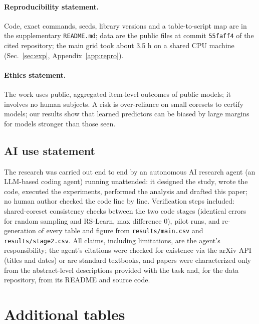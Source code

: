 \documentclass{article}
\begin{document}
\paragraph{Reproducibility statement.}
Code, exact commands, seeds, library versions and a table-to-script map are in the supplementary \texttt{README.md}; data are the public files at commit \texttt{55faff4} of the cited repository; the main grid took about 3.5 h on a shared CPU machine (Sec.~\ref{sec:exp}, Appendix~\ref{app:repro}).

\paragraph{Ethics statement.}
The work uses public, aggregated item-level outcomes of public models; it involves no human subjects. A risk is over-reliance on small coresets to certify models; our results show that learned predictors can be biased by large margins for models stronger than those seen.

\subsection*{AI use statement}
The research was carried out end to end by an autonomous AI research agent (an LLM-based coding agent) running unattended: it designed the study, wrote the code, executed the experiments, performed the analysis and drafted this paper; no human author checked the code line by line. Verification steps included: shared-coreset consistency checks between the two code stages (identical errors for random sampling and RS-Learn, max difference $0$), pilot runs, and re-generation of every table and figure from \texttt{results/main.csv} and \texttt{results/stage2.csv}. All claims, including limitations, are the agent's responsibility; the agent's citations were checked for existence via the arXiv API (titles and dates) or are standard textbooks, and papers were characterized only from the abstract-level descriptions provided with the task and, for the data repository, from its README and source code.




\appendix
\section{Additional tables}
\label{app:tables}
\begin{table}[h]
\centering\scriptsize
\caption{Datasets (after loading the \texttt{.jbl} matrices at commit \texttt{55faff4}). \emph{sd}: standard deviation of model accuracies; \emph{const.}: fraction of items answered identically by all models; \emph{dup.}: fraction of model rows that duplicate another row.}
\label{tab:data}

\end{table}
\end{document}
